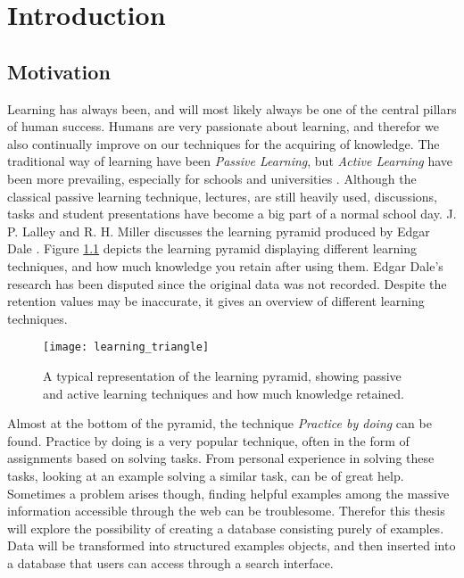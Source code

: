
\chapter{Introduction}

\section{Motivation}

Learning has always been, and will most likely always be one of the central pillars of human success. Humans are very passionate about learning, and therefor we also continually improve on our techniques for the acquiring of knowledge. The traditional way of learning have been \textit{Passive Learning}, but \textit{Active Learning} have been more prevailing, especially for schools and universities \cite{active-learning}. Although the classical passive learning technique, lectures, are still heavily used, discussions, tasks and student presentations have become a big part of a normal school day. J. P. Lalley and R. H. Miller discusses the learning pyramid produced by Edgar Dale \cite{learning_pyramid}. Figure \ref{fig:lt} depicts the learning pyramid displaying different learning techniques, and how much knowledge you retain after using them. Edgar Dale's research has been disputed since the original data was not recorded. Despite the retention values may be inaccurate, it gives an overview of different learning techniques. 

\begin{figure}[h] 
\caption{A typical representation of the learning pyramid, showing passive and active learning techniques and how much knowledge retained.}
\texttt{[image: learning\_triangle]}
\label{fig:lt}
\end{figure}

Almost at the bottom of the pyramid, the technique \textit{Practice by doing} can be found. Practice by doing is a very popular technique, often in the form of assignments based on solving tasks. From personal experience in solving these tasks, looking at an example solving a similar task, can be of great help. Sometimes a problem arises though, finding helpful examples among the massive information accessible through the web can be troublesome. Therefor this thesis will explore the possibility of creating a database consisting purely of examples. Data will be transformed into structured examples objects, and then inserted into a database that users can access through a search interface. 



